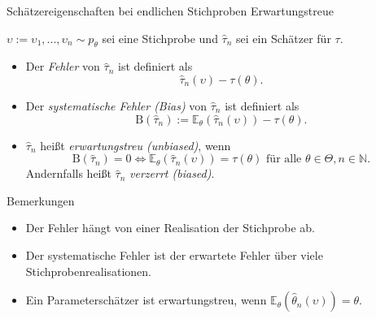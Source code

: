 \documentclass[
  8pt,
  ignorenonframetext,
]{beamer}
\providecommand{\tightlist}{%
  \setlength{\itemsep}{0pt}\setlength{\parskip}{0pt}}
\newcommand{\ups} {\upsilon}
\begin{document}
\begin{frame}{\small Schätzereigenschaften bei endlichen Stichproben
\textbar{} Erwartungstreue}
\protect\hypertarget{schuxe4tzereigenschaften-bei-endlichen-stichproben-erwartungstreue}{}
\small
\begin{definition}
$\ups := \ups_1,...,\ups_n \sim  p_\theta$ sei eine Stichprobe und $\hat{\tau}_n$ sei ein Schätzer für $\tau$.
\begin{itemize}
\item Der \textit{Fehler} von $\hat{\tau}_n$ ist definiert als
\begin{equation}
\hat{\tau}_n(\ups) - \tau(\theta).
\end{equation}
\item Der \textit{systematische Fehler (Bias)} von $\hat{\tau}_n$ ist definiert als
\begin{equation}
\mbox{B}(\hat{\tau}_n) := \mathbb{E}_{\theta}(\hat{\tau}_n(\ups)) - \tau(\theta).
\end{equation}
\item $\hat{\tau}_n$ heißt \textit{erwartungstreu (unbiased)}, wenn
\begin{equation}
\mbox{B}(\hat{\tau}_n) = 0\Leftrightarrow
\mathbb{E}_{\theta}(\hat{\tau}_n(\ups)) = \tau(\theta) \mbox{ für alle } \theta \in \Theta, n \in \mathbb{N}.
\end{equation}
Andernfalls heißt $\hat{\tau}_n$  \textit{verzerrt (biased)}.
\end{itemize}
\end{definition}

\footnotesize

Bemerkungen

\begin{itemize}
\tightlist
\item
  Der Fehler hängt von einer Realisation der Stichprobe ab.
\item
  Der systematische Fehler ist der erwartete Fehler über viele
  Stichprobenrealisationen.
\item
  Ein Parameterschätzer ist erwartungstreu, wenn
  \(\mathbb{E}_{\theta}(\hat{\theta}_n(\ups)) = \theta\).
\end{itemize}
\end{frame}
\end{document}
